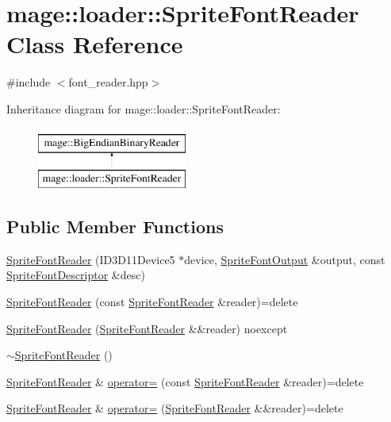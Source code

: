 \hypertarget{classmage_1_1loader_1_1_sprite_font_reader}{}\section{mage\+:\+:loader\+:\+:Sprite\+Font\+Reader Class Reference}
\label{classmage_1_1loader_1_1_sprite_font_reader}


{\ttfamily \#include $<$font\+\_\+reader.\+hpp$>$}

Inheritance diagram for mage\+:\+:loader\+:\+:Sprite\+Font\+Reader\+:\begin{figure}[H]
\begin{center}
\leavevmode
\includegraphics[height=2.000000cm]{classmage_1_1loader_1_1_sprite_font_reader}
\end{center}
\end{figure}
\subsection*{Public Member Functions}
\begin{DoxyCompactItemize}
\item 
\hyperlink{classmage_1_1loader_1_1_sprite_font_reader_aeb66e93ba6fea6590dcb4ddb290d279d}{Sprite\+Font\+Reader} (I\+D3\+D11\+Device5 $\ast$device, \hyperlink{structmage_1_1_sprite_font_output}{Sprite\+Font\+Output} \&output, const \hyperlink{structmage_1_1_sprite_font_descriptor}{Sprite\+Font\+Descriptor} \&desc)
\item 
\hyperlink{classmage_1_1loader_1_1_sprite_font_reader_aedfd065cd87ae46855b98efe9a73752b}{Sprite\+Font\+Reader} (const \hyperlink{classmage_1_1loader_1_1_sprite_font_reader}{Sprite\+Font\+Reader} \&reader)=delete
\item 
\hyperlink{classmage_1_1loader_1_1_sprite_font_reader_aaeca152199f1772be8c046ade184c6e8}{Sprite\+Font\+Reader} (\hyperlink{classmage_1_1loader_1_1_sprite_font_reader}{Sprite\+Font\+Reader} \&\&reader) noexcept
\item 
\hyperlink{classmage_1_1loader_1_1_sprite_font_reader_a6734ae8c3bfe35d7199815c3383647f3}{$\sim$\+Sprite\+Font\+Reader} ()
\item 
\hyperlink{classmage_1_1loader_1_1_sprite_font_reader}{Sprite\+Font\+Reader} \& \hyperlink{classmage_1_1loader_1_1_sprite_font_reader_a65ddea9d2f842f2e6d81c3f4dccb62a6}{operator=} (const \hyperlink{classmage_1_1loader_1_1_sprite_font_reader}{Sprite\+Font\+Reader} \&reader)=delete
\item 
\hyperlink{classmage_1_1loader_1_1_sprite_font_reader}{Sprite\+Font\+Reader} \& \hyperlink{classmage_1_1loader_1_1_sprite_font_reader_a99c1034c7dbe89b5e2dc2f2106c09360}{operator=} (\hyperlink{classmage_1_1loader_1_1_sprite_font_reader}{Sprite\+Font\+Reader} \&\&reader)=delete
\end{DoxyCompactItemize}
